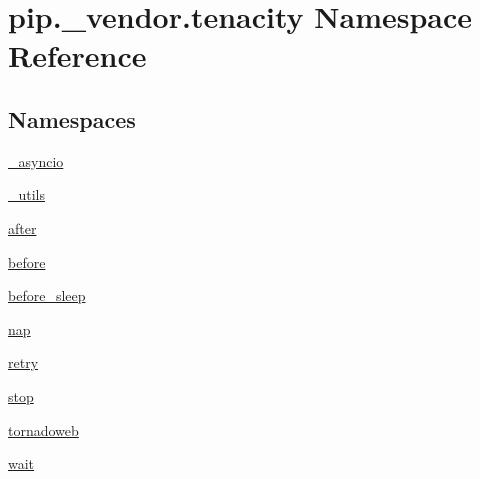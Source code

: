\hypertarget{namespacepip_1_1__vendor_1_1tenacity}{}\section{pip.\+\_\+vendor.\+tenacity Namespace Reference}
\label{namespacepip_1_1__vendor_1_1tenacity}
\subsection*{Namespaces}
\begin{DoxyCompactItemize}
\item 
 \hyperlink{namespacepip_1_1__vendor_1_1tenacity_1_1__asyncio}{\+\_\+asyncio}
\item 
 \hyperlink{namespacepip_1_1__vendor_1_1tenacity_1_1__utils}{\+\_\+utils}
\item 
 \hyperlink{namespacepip_1_1__vendor_1_1tenacity_1_1after}{after}
\item 
 \hyperlink{namespacepip_1_1__vendor_1_1tenacity_1_1before}{before}
\item 
 \hyperlink{namespacepip_1_1__vendor_1_1tenacity_1_1before__sleep}{before\+\_\+sleep}
\item 
 \hyperlink{namespacepip_1_1__vendor_1_1tenacity_1_1nap}{nap}
\item 
 \hyperlink{namespacepip_1_1__vendor_1_1tenacity_1_1retry}{retry}
\item 
 \hyperlink{namespacepip_1_1__vendor_1_1tenacity_1_1stop}{stop}
\item 
 \hyperlink{namespacepip_1_1__vendor_1_1tenacity_1_1tornadoweb}{tornadoweb}
\item 
 \hyperlink{namespacepip_1_1__vendor_1_1tenacity_1_1wait}{wait}
\end{DoxyCompactItemize}
